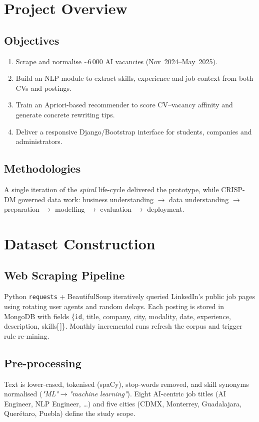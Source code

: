 \documentclass[12pt,a4paper]{article}
\begin{document}
	\section{Project Overview}
	\subsection{Objectives}
	\begin{enumerate}[label=\alph*)]
		\item Scrape and normalise \textasciitilde6\,000 AI vacancies (Nov~2024–May~2025).
		\item Build an NLP module to extract skills, experience and job context from both CVs and postings.
		\item Train an Apriori-based recommender to score CV–vacancy affinity and generate concrete rewriting tips.
		\item Deliver a responsive Django/Bootstrap interface for students, companies and administrators.
	\end{enumerate}
	
	\subsection{Methodologies}
	A single iteration of the \emph{spiral} life-cycle delivered the prototype, while CRISP-DM governed data work: business understanding $\rightarrow$ data understanding $\rightarrow$ preparation $\rightarrow$ modelling $\rightarrow$ evaluation $\rightarrow$ deployment.
	
	\section{Dataset Construction}
	\subsection{Web Scraping Pipeline}
	Python \texttt{requests} + BeautifulSoup iteratively queried LinkedIn’s public job pages using rotating user agents and random delays. Each posting is stored in MongoDB with fields \{\texttt{id}, title, company, city, modality, date, experience, description, skills[\,]\}. Monthly incremental runs refresh the corpus and trigger rule re-mining.
	
	\subsection{Pre-processing}
	Text is lower-cased, tokenised (spaCy), stop-words removed, and skill synonyms normalised (\emph{"ML"}$\to$\emph{"machine learning"}). Eight AI-centric job titles (AI Engineer, NLP Engineer, \dots) and five cities (CDMX, Monterrey, Guadalajara, Querétaro, Puebla) define the study scope.
	
\end{document}
